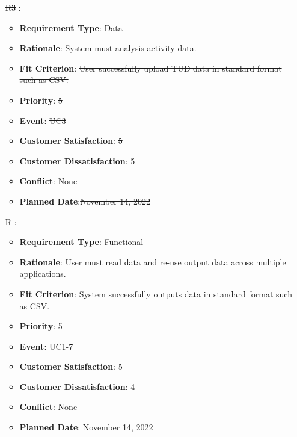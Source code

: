 \documentclass[12pt, titlepage]{article}
\newcounter{reqnum} %
\begin{document}
\begin{itemize}
\item[\sout{R3}
\label{R_Inputs_1}:] 
\begin{itemize}
    \item \textbf{Requirement Type}: \sout{Data}
    \item \textbf{Rationale}: \sout{System must analysis activity data.}
    \item \textbf{Fit Criterion}: \sout{User successfully upload TUD data in standard format such as CSV. }
    \item \textbf{Priority}: \sout{5}
    \item \textbf{Event}: \sout{UC3}
    \item \textbf{Customer Satisfaction}: \sout{5}
    \item \textbf{Customer Dissatisfaction}: \sout{5}
    \item \textbf{Conflict}: \sout{None}
    \item \textbf{Planned Date}:\sout{November 14, 2022}
\end{itemize}

\item[R\refstepcounter{reqnum}\thereqnum
\label{R_Output_3}:] 
\begin{itemize}
    \item \textbf{Requirement Type}: Functional
    \item \textbf{Rationale}: User must read data and re-use output data across multiple applications.
    \item \textbf{Fit Criterion}: System successfully outputs data in standard format such as CSV. 
    \item \textbf{Priority}: 5
    \item \textbf{Event}: UC1-7
    \item \textbf{Customer Satisfaction}: 5
    \item \textbf{Customer Dissatisfaction}: 4
    \item \textbf{Conflict}: None
    \item \textbf{Planned Date}: November 14, 2022
\end{itemize}


\end{itemize}
\end{document}
